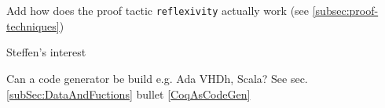 \section{}

Add how does the proof tactic \lstinline!reflexivity! actually work \label{sec:reflexivity} (see \ref{subsec:proof-techniques})

Steffen's interest

Can a code generator be build e.g. Ada VHDh, Scala? See sec. \ref{subSec:DataAndFuctions} bullet \ref{CoqAsCodeGen}